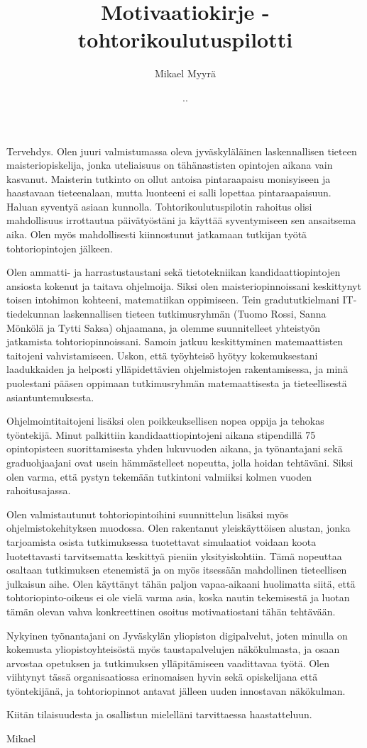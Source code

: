 \documentclass{article}
\title{Motivaatiokirje - tohtorikoulutuspilotti}
\author{Mikael Myyrä}
\date{\number\day.\number\month.\number\year}
\begin{document}
\maketitle

Tervehdys. Olen juuri valmistumassa oleva
jyväskyläläinen laskennallisen tieteen maisteriopiskelija,
jonka uteliaisuus on tähänastisten opintojen aikana vain kasvanut.
Maisterin tutkinto on ollut antoisa pintaraapaisu monisyiseen ja haastavaan tieteenalaan,
mutta luonteeni ei salli lopettaa pintaraapaisuun.
Haluan syventyä asiaan kunnolla.
Tohtorikoulutuspilotin rahoitus olisi mahdollisuus irrottautua päivätyöstäni
ja käyttää syventymiseen sen ansaitsema aika.
Olen myös mahdollisesti kiinnostunut jatkamaan tutkijan työtä
tohtoriopintojen jälkeen.

Olen ammatti- ja harrastustaustani sekä tietotekniikan kandidaattiopintojen ansiosta
kokenut ja taitava ohjelmoija.
Siksi olen maisteriopinnoissani keskittynyt toisen intohimon kohteeni, matematiikan oppimiseen.
Tein gradututkielmani IT-tiedekunnan laskennallisen tieteen tutkimusryhmän 
(Tuomo Rossi, Sanna Mönkölä ja Tytti Saksa) ohjaamana,
ja olemme suunnitelleet yhteistyön jatkamista tohtoriopinnoissani.
Samoin jatkuu keskittyminen matemaattisten taitojeni vahvistamiseen.
Uskon, että työyhteisö hyötyy kokemuksestani
laadukkaiden ja helposti ylläpidettävien ohjelmistojen rakentamisessa,
ja minä puolestani pääsen oppimaan tutkimusryhmän
matemaattisesta ja tieteellisestä asiantuntemuksesta.

Ohjelmointitaitojeni lisäksi olen poikkeuksellisen nopea oppija ja tehokas työntekijä.
Minut palkittiin kandidaattiopintojeni aikana stipendillä 75 opintopisteen suorittamisesta
yhden lukuvuoden aikana, ja työnantajani sekä graduohjaajani ovat usein
hämmästelleet nopeutta, jolla hoidan tehtäväni.
Siksi olen varma, että pystyn tekemään tutkintoni valmiiksi kolmen vuoden rahoitusajassa.

Olen valmistautunut tohtoriopintoihini suunnittelun lisäksi myös ohjelmistokehityksen muodossa.
Olen rakentanut yleiskäyttöisen alustan, jonka tarjoamista osista
tutkimuksessa tuotettavat simulaatiot voidaan koota luotettavasti
tarvitsematta keskittyä pieniin yksityiskohtiin.
Tämä nopeuttaa osaltaan tutkimuksen etenemistä
ja on myös itsessään mahdollinen tieteellisen julkaisun aihe.
Olen käyttänyt tähän paljon vapaa-aikaani
huolimatta siitä, että tohtoriopinto-oikeus ei ole vielä varma asia,
koska nautin tekemisestä
ja luotan tämän olevan vahva konkreettinen osoitus motivaatiostani tähän tehtävään.

Nykyinen työnantajani on Jyväskylän yliopiston digipalvelut,
joten minulla on kokemusta yliopistoyhteisöstä myös taustapalvelujen näkökulmasta,
ja osaan arvostaa opetuksen ja tutkimuksen ylläpitämiseen vaadittavaa työtä.
Olen viihtynyt tässä organisaatiossa erinomaisen hyvin
sekä opiskelijana että työntekijänä,
ja tohtoriopinnot antavat jälleen uuden innostavan näkökulman.

Kiitän tilaisuudesta ja osallistun mielelläni tarvittaessa haastatteluun.

Mikael
\end{document}
